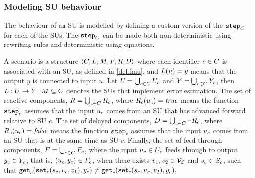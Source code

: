 \subsubsection{Modeling SU behaviour}
The behaviour of an SU is modelled by defining a custom version of the  $\mathtt{step}_{C}$ for each of the SUs. 
The $\mathtt{step}_{C}$ can be made both non-deterministic using rewriting rules and deterministic using equations.



\begin{definition}[Scenario]\label{def:cosim_scenario}
  A scenario is a structure $ \left\langle C, L, M, F, R, D \right\rangle $ where each identifier $c \in C$ is associated with an SU, as defined in \cref{def:fmu}, and $L(u)=y$ means that the output $y$ is connected to input $u$.
  Let $U = \bigcup_{c \in C} U_{c}$ and $Y = \bigcup_{c \in C} Y_{c}$, then $L : U \to Y$. 
  $M \subseteq C$ denotes the SUs that implement error estimation. 
  The set of reactive components,
  $R = \bigcup_{c \in C} R_{c}$, where $R_{c}(u_{c}) = \mathit{true}$ means the function $\mathtt{step}_{c}$ assumes that the input $u_{c}$ comes from an SU that has advanced forward relative to SU $c$.  
The set of delayed components,
  $D = \bigcup_{c \in C} \neg R_{c}$, where $R_{c}(u_{c}) = \mathit{false}$ means the function $\mathtt{step}_{c}$ assumes that the input $u_{c}$ comes from an SU that is at the same time as SU $c$. 
 Finally, the set of feed-through components, $F = \bigcup_{c \in C} F_{c}$, where the input $u_{c} \in U_{c}$ feeds through to output $y_{c} \in Y_{c}$, that is, $(u_{c},y_{c}) \in F_{c}$, when there exists $v_1, v_2 \in \mathcal{V_{E}}$ and $s_{c} \in S_{c}$, such that
  $\mathtt{get}_{c} (\mathtt{set}_{c}(s_{c}, u_{c}, v_1), y_{c}) \neq \mathtt{get}_{c} (\mathtt{set}_{c}(s_{c}, u_{c}, v_2), y_{c}).$
\end{definition}  

